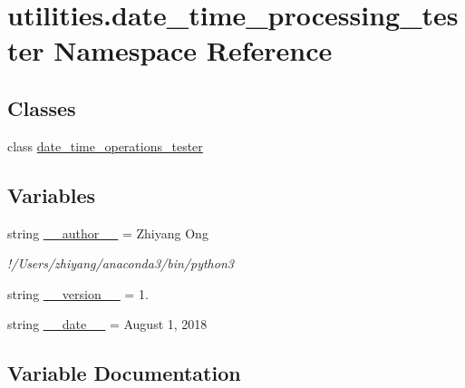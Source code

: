 \hypertarget{namespaceutilities_1_1date__time__processing__tester}{}\section{utilities.\+date\+\_\+time\+\_\+processing\+\_\+tester Namespace Reference}
\label{namespaceutilities_1_1date__time__processing__tester}
\subsection*{Classes}
\begin{DoxyCompactItemize}
\item 
class \hyperlink{classutilities_1_1date__time__processing__tester_1_1date__time__operations__tester}{date\+\_\+time\+\_\+operations\+\_\+tester}
\end{DoxyCompactItemize}
\subsection*{Variables}
\begin{DoxyCompactItemize}
\item 
string \hyperlink{namespaceutilities_1_1date__time__processing__tester_ae1106460c338050149a3f7aa6690002a}{\+\_\+\+\_\+author\+\_\+\+\_\+} = \textquotesingle{}Zhiyang Ong\textquotesingle{}
\begin{DoxyCompactList}\small\item\em !/\+Users/zhiyang/anaconda3/bin/python3 \end{DoxyCompactList}\item 
string \hyperlink{namespaceutilities_1_1date__time__processing__tester_a98cf80a86a0ee83e7b23e071b489b6b8}{\+\_\+\+\_\+version\+\_\+\+\_\+} = \textquotesingle{}1.\textquotesingle{}
\item 
string \hyperlink{namespaceutilities_1_1date__time__processing__tester_a3cf1bc57db206c3849901a593e205b09}{\+\_\+\+\_\+date\+\_\+\+\_\+} = \textquotesingle{}August 1, 2018\textquotesingle{}
\end{DoxyCompactItemize}


\subsection{Variable Documentation}
\hypertarget{namespaceutilities_1_1date__time__processing__tester_ae1106460c338050149a3f7aa6690002a}{}
